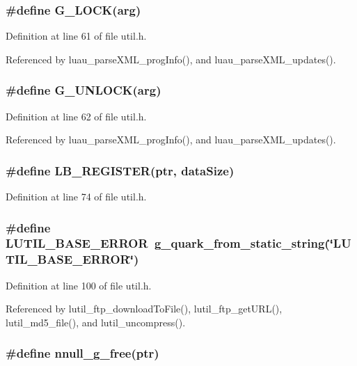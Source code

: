 \subsubsection{\setlength{\rightskip}{0pt plus 5cm}\#define G\_\-LOCK(arg)}\label{util_8h_a0}




Definition at line 61 of file util.h.

Referenced by luau\_\-parse\-XML\_\-prog\-Info(), and luau\_\-parse\-XML\_\-updates().
\subsubsection{\setlength{\rightskip}{0pt plus 5cm}\#define G\_\-UNLOCK(arg)}\label{util_8h_a1}




Definition at line 62 of file util.h.

Referenced by luau\_\-parse\-XML\_\-prog\-Info(), and luau\_\-parse\-XML\_\-updates().
\subsubsection{\setlength{\rightskip}{0pt plus 5cm}\#define LB\_\-REGISTER(ptr, data\-Size)}\label{util_8h_a2}




Definition at line 74 of file util.h.
\subsubsection{\setlength{\rightskip}{0pt plus 5cm}\#define LUTIL\_\-BASE\_\-ERROR\ g\_\-quark\_\-from\_\-static\_\-string(\char`\"{}LUTIL\_\-BASE\_\-ERROR\char`\"{})}\label{util_8h_a6}




Definition at line 100 of file util.h.

Referenced by lutil\_\-ftp\_\-download\-To\-File(), lutil\_\-ftp\_\-get\-URL(), lutil\_\-md5\_\-file(), and lutil\_\-uncompress().
\subsubsection{\setlength{\rightskip}{0pt plus 5cm}\#define nnull\_\-g\_\-free(ptr)}\label{util_8h_a4}


